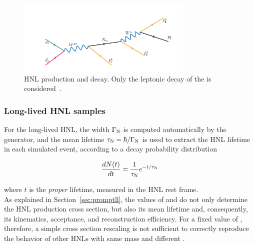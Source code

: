 \begin{figure}[h!]
\centering
 \includegraphics[clip,trim=0.5cm 0.5cm 0.5cm 2.5cm, width=0.75\textwidth]{Figures/c4/hnl_graph}
  \caption{HNL production and decay. Only the leptonic decay of the
    \PW is considered~\cite{Pascoli_2019}.}
  \label{fig:c46}
\end{figure}


\subsubsection{Long-lived HNL samples}\label{sec:reweighting}
For the long-lived HNL, the width $\Gamma_{\mathrm{N}}$ is computed automatically by the
generator, and the mean lifetime $\tau_{\mathrm{N}} = \hbar/\Gamma_{\mathrm{N}}$
is used to extract the HNL lifetime in each simulated event,
according to a decay probability distribution
\begin{linenomath}
  \begin{equation}
\frac{dN(t)}{dt} = \frac{1}{\tau_{\mathrm{N}}}e^{-t/\tau_{\mathrm{N}}}
  \end{equation}
  \label{eq:dndt}
\end{linenomath}
where $t$ is the
\emph{proper} lifetime, measured in the HNL rest frame.\\
As explained in Section~\ref{sec:promptll}, the values of \mhnl
and \mixpar do not only determine the HNL production cross section,
but also its mean lifetime and, consequently, its kinematics,
acceptance, and reconstruction efficiency.
For a fixed value of \mhnl, therefore, a simple cross section
rescaling is not sufficient to correctly reproduce the behavior of
other HNLs with same mass and different \mixpar.

